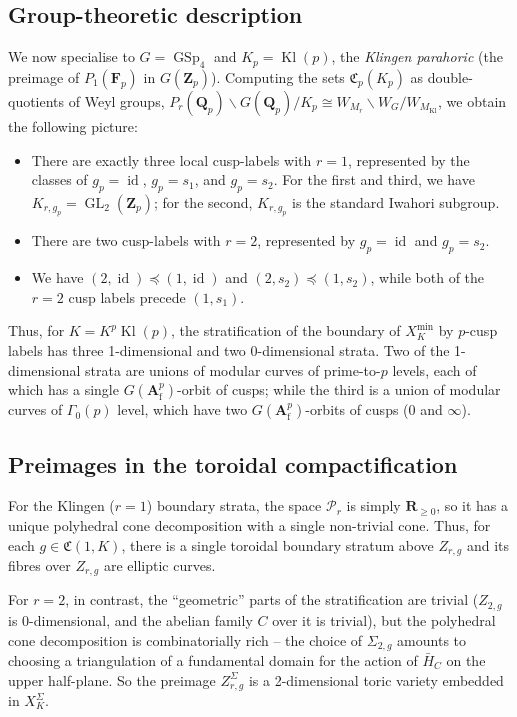 \documentclass[cjm]{ipart}
\theoremstyle{plain}
\theoremstyle{remark}
\DeclareMathOperator{\GL}{GL}
\DeclareMathOperator{\GSp}{GSp}
\DeclareMathOperator{\id}{id}
\DeclareMathOperator{\Kl}{Kl}
\newcommand{\Af}{\AA_{\mathrm{f}}}
\newcommand{\Fp}{\mathbf{F}_p}
\newcommand{\QQ}{\mathbf{Q}}
\newcommand{\Qp}{\QQ_p}
\newcommand{\RR}{\mathbf{R}}
\newcommand{\Zp}{\mathbf{Z}_p}
\newcommand{\cP}{\mathcal{P}}
\renewcommand{\AA}{\mathbf{A}}
\numberwithin{equation}{subsection}
\renewcommand{\ge}{\geqslant}
\begin{document}
 \subsection{Group-theoretic description} We now specialise to $G = \GSp_4$ and $K_p = \Kl(p)$, the \emph{Klingen parahoric} (the preimage of $P_1(\Fp)$ in $G(\Zp)$). Computing the sets $\mathfrak{C}_p(K_p)$ as double-quotients of Weyl groups, $P_r(\Qp) \backslash G(\Qp) / K_p \cong W_{M_r} \backslash W_G / W_{M_{\Kl}}$, we obtain the following picture:
  \begin{itemize}

   \item There are exactly three local cusp-labels with $r = 1$, represented by the classes of $g_p = \id$, $g_p = s_1$, and $g_p = s_2$. For the first and third, we have $K_{r, g_p} = \GL_2(\Zp)$; for the second, $K_{r, g_p}$ is the standard Iwahori subgroup.

   \item There are two cusp-labels with $r = 2$, represented by $g_p = \id$ and $g_p = s_2$.

   \item We have $(2, \id) \preccurlyeq (1, \id)$ and $(2, s_2) \preccurlyeq (1, s_2)$, while both of the $r=2$ cusp labels precede $(1, s_1)$.
  \end{itemize}

  Thus, for $K = K^p \Kl(p)$, the stratification of the boundary of $X_K^{\min}$ by $p$-cusp labels has three 1-dimensional and two 0-dimensional strata. Two of the 1-dimensional strata are unions of modular curves of prime-to-$p$ levels, each of which has a single $G(\Af^p)$-orbit of cusps; while the third is a union of modular curves of $\Gamma_0(p)$ level, which have two $G(\Af^p)$-orbits of cusps ($0$ and $\infty$).

 \subsection{Preimages in the toroidal compactification}
 
  For the Klingen ($r = 1$) boundary strata, the space $\cP_r$ is simply $\RR_{\ge 0}$, so it has a unique polyhedral cone decomposition with a single non-trivial cone. Thus, for each $g \in \mathfrak{C}(1, K)$, there is a single toroidal boundary stratum above $Z_{r, g}$ and its fibres over $Z_{r, g}$ are elliptic curves.
  
  For $r = 2$, in contrast, the ``geometric'' parts of the stratification are trivial ($Z_{2, g}$ is 0-dimensional, and the abelian family $C$ over it is trivial), but the polyhedral cone decomposition is combinatorially rich -- the choice of $\Sigma_{2, g}$ amounts to choosing a triangulation of a fundamental domain for the action of $\bar{H}_C$ on the upper half-plane. So the preimage $Z^{\Sigma}_{r, g}$ is a 2-dimensional toric variety embedded in $X_K^{\Sigma}$.
  
\end{document}
